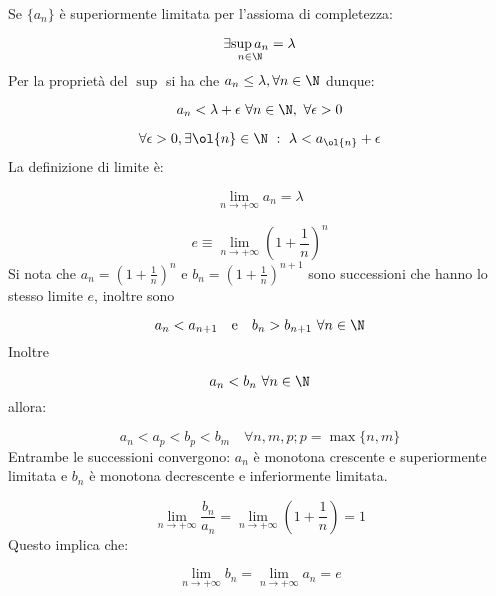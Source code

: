\documentclass[../appunti.tex]{subfiles}
\begin{document}
\begin{dimo}
Se $ \{ a_n \}$ è superiormente limitata per l'assioma di completezza:

\begin{equation}
	\exists \underset{n \in \N}{\sup a_n} = \lambda
\end{equation}
Per la proprietà del $ \sup$ si ha che $ a_n \leq \lambda, \forall n \in \N$ dunque:

\begin{equation}
	a_n < \lambda + \epsilon \ \forall n \in \N, \ \forall \epsilon > 0
\end{equation}

\begin{equation}
	\forall \epsilon > 0, \exists \ol{n} \in \N\ :\
	\lambda < a_{\ol{n}} + \epsilon
\end{equation}
La definizione di limite è:

\begin{equation}
	\lim \limits_{n \to + \infty} a_n = \lambda
\end{equation}
\end{dimo}

\begin{eser}[Il numero di nepero $ e $]

\begin{equation}
	e \equiv \lim \limits_{n \to + \infty} \left( 1 + \frac{1}{n} \right)^n
\end{equation}
Si nota che $a_n = \left( 1 + \frac{1}{n} \right)^n$ e $ b_n =
\left( 1 + \frac{1}{n} \right)^{n+1}$ sono successioni  che hanno lo stesso limite $ e $, inoltre sono  

\begin{equation}
	a_n < a_{n + 1} \quad \mbox{e} \quad b_n > b_{n+1} \ \forall n \in \N
\end{equation}
Inoltre 

\begin{equation}
	a_n < b_n\ \forall n \in \N 
\end{equation}
allora: 

\begin{equation}
	a_n < a_p < b_p < b_m \quad \forall n,m,p; p = \max \{n, m\}
\end{equation}
Entrambe le successioni convergono: $a_n$ è monotona crescente e superiormente limitata e $b_n$ è monotona decrescente e inferiormente limitata.

\begin{equation}
	\lim \limits_{n \to + \infty} \frac{b_n}{a_n} = 
	\lim \limits_{n \to + \infty} \left( 1 + \frac{1}{n} \right) = 1
\end{equation}
Questo implica che:

\begin{equation} 
	\lim \limits_{n \to + \infty} b_n = 
	\lim \limits_{n \to + \infty} a_n = e
\end{equation}

\end{eser}
\end{document}
